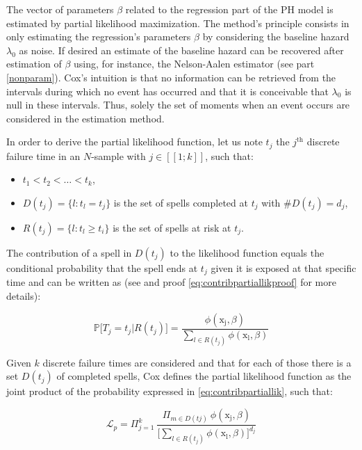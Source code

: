 \documentclass[
]{book}
\providecommand{\tightlist}{%
  \setlength{\itemsep}{0pt}\setlength{\parskip}{0pt}}
\begin{document}
The vector of parameters \(\beta\) related to the regression part of the PH model is estimated by partial likelihood maximization. The method's principle consists in only estimating the regression's parameters \(\beta\) by considering the baseline hazard \(\lambda_0\) as noise. If desired an estimate of the baseline hazard can be recovered after estimation of \(\beta\) using, for instance, the Nelson-Aalen estimator (see part \ref{nonparam}). Cox's intuition is that no information can be retrieved from the intervals during which no event has occurred and that it is conceivable that \(\lambda_0\) is null in these intervals. Thus, solely the set of moments when an event occurs are considered in the estimation method.

In order to derive the partial likelihood function, let us note \(t_j\) the \(j^{\text{th}}\) discrete failure time in an \(N\)-sample with \(j \in [\![1; k]\!]\), such that:

\begin{itemize}
\tightlist
\item
  \(t_1 < t_2 < \dots < t_k\),
\item
  \(D(t_j) = \{l: t_l = t_j\}\) is the set of spells completed at \(t_j\) with \(\#D(t_j) = d_j\),
\item
  \(R(t_j) = \{l: t_l \geq t_i\}\) is the set of spells at risk at \(t_j\).
\end{itemize}

The contribution of a spell in \(D(t_j)\) to the likelihood function equals the conditional probability that the spell ends at \(t_j\) given it is exposed at that specific time and can be written as (see \citet{CAMERON_TRIVEDI} and proof \eqref{eq:contribpartiallikproof} for more details):

\begin{equation}
  \mathbb{P}\big[T_j = t_j | R(t_j) \big] = \frac{\phi(\mathrm{x_j}, \beta)}{\sum_{l \in R(t_j)} \phi(\mathrm{x_l}, \beta)}
  \label{eq:contribpartiallik}
\end{equation}

Given \(k\) discrete failure times are considered and that for each of those there is a set \(D(t_j)\) of completed spells, Cox defines the partial likelihood function as the joint product of the probability expressed in \eqref{eq:contribpartiallik}, such that:

\begin{equation}
  \mathcal{L}_p = \Pi_{j=1}^{k} \ \frac{\Pi_{m \in D(tj)} \ \phi(\mathrm{x_j}, \beta)}{\Big[\sum_{l \in R(t_j)} \phi(\mathrm{x_l}, \beta)\Big]^{d_j}}
  \label{eq:partlik}
\end{equation}
\end{document}
